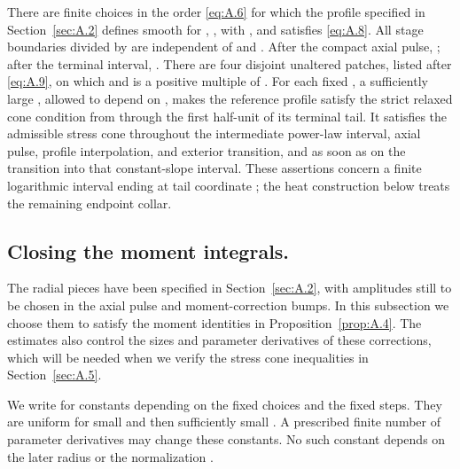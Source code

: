 \begin{proposition}\label{prop:A.4}
There are finite choices in the order \eqref{eq:A.6} for which the profile specified in
Section~\ref{sec:A.2} defines smooth  for
, , with
, and satisfies \eqref{eq:A.8}. All stage boundaries divided by
 are independent of  and
. After the compact axial pulse,
; after the terminal interval,
. There are four disjoint unaltered patches, listed after
\eqref{eq:A.9}, on which  and  is a positive
multiple of . For each fixed
%
\NSi{NS-F-P131-001}{x_-\in(0,1]}, a sufficiently large , allowed to
depend on , makes the reference profile satisfy the strict relaxed cone
condition from  through the first half-unit of its terminal tail. It
satisfies the admissible stress cone throughout the intermediate power-law interval, axial pulse,
profile interpolation, and exterior transition, and as soon as  on the
transition into that constant-slope interval. These assertions concern a finite logarithmic interval
ending at tail coordinate ; the heat construction below treats the
remaining endpoint collar.
\end{proposition}

\subsection{Closing the moment integrals.}\label{sec:A.3}
The radial pieces have been specified in Section~\ref{sec:A.2}, with amplitudes still to be chosen in
the axial pulse and moment-correction bumps. In this subsection we choose them to satisfy the
moment identities in Proposition~\ref{prop:A.4}. The estimates also control the sizes and parameter
derivatives of these corrections, which will be needed when we verify the stress cone inequalities in
Section~\ref{sec:A.5}.

We write  for constants depending on the fixed choices
 and the fixed steps. They are uniform for small
 and then sufficiently small . A prescribed
finite number of parameter derivatives may change these constants. No such constant depends on
the later radius  or the normalization .


